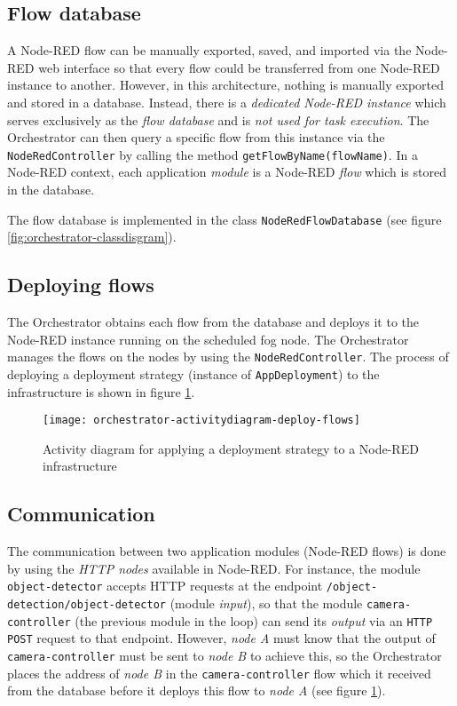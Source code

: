 \subsection*{Flow database}
A Node-RED flow can be manually exported, saved, and imported via the Node-RED web interface so that every flow could be transferred from one Node-RED instance to another.
However, in this architecture, nothing is manually exported and stored in a database.
Instead, there is a \textit{dedicated Node-RED instance} which serves exclusively as the \textit{flow database} and is \textit{not used for task execution}.
The Orchestrator can then query a specific flow from this instance via the \texttt{NodeRedController} by calling the method \texttt{getFlowByName(flowName)}.
In a Node-RED context, each application \textit{module} is a Node-RED \textit{flow} which is stored in the database.

The flow database is implemented in the class \texttt{NodeRedFlowDatabase} (see figure \ref{fig:orchestrator-classdisgram}).

\subsection*{Deploying flows}
The Orchestrator obtains each flow from the database and deploys it to the Node-RED instance running on the scheduled fog node.
The Orchestrator manages the flows on the nodes by using the \texttt{NodeRedController}.
The process of deploying a deployment strategy (instance of \texttt{AppDeployment}) to the infrastructure is shown in figure \ref{fig:orchestrator-activitydiagram-deploy-flows}.

\begin{figure}[h!]
    \centering
    \texttt{[image: orchestrator-activitydiagram-deploy-flows]}
    \caption{Activity diagram for applying a deployment strategy to a Node-RED infrastructure}
    \label{fig:orchestrator-activitydiagram-deploy-flows}
\end{figure}

\subsection*{Communication}
The communication between two application modules (Node-RED flows) is done by using the \textit{HTTP nodes} available in Node-RED.
For instance, the module \texttt{object-detector} accepts HTTP requests at the endpoint \texttt{/object-detection/object-detector} (module \textit{input}), so that the module \texttt{camera-controller} (the previous module in the loop) can send its \textit{output} via an \texttt{HTTP POST} request to that endpoint.
However, \textit{node A} must know that the output of \texttt{camera-controller} must be sent to \textit{node B} to achieve this, so the Orchestrator places the address of \textit{node B} in the \texttt{camera-controller} flow which it received from the database before it deploys this flow to \textit{node A} (see figure \ref{fig:orchestrator-activitydiagram-deploy-flows}).

